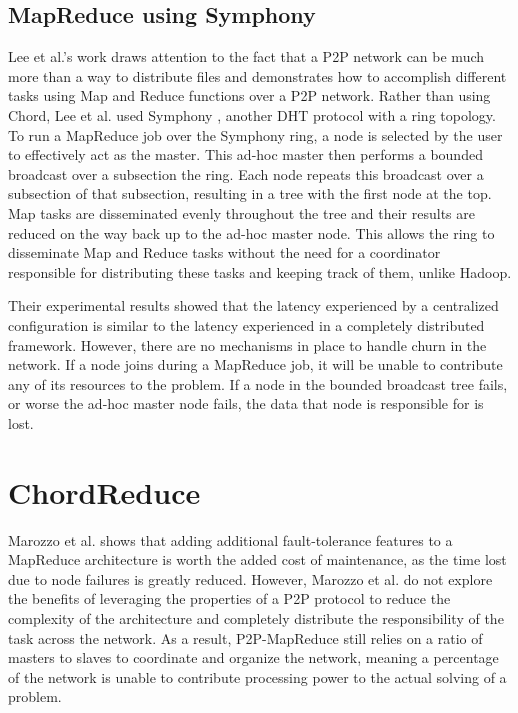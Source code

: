 \documentclass[10pt, conference, compsocconf]{IEEEtran}
\begin{document}
\subsection{MapReduce using Symphony}

Lee et al.'s work \cite{leemap} draws attention to the fact that a P2P network can be much more than a way to distribute files and demonstrates how to accomplish different tasks using Map and Reduce functions over a P2P network.  Rather than using Chord, Lee et al. used Symphony \cite{symphony}, another DHT protocol with a ring topology.  To run a MapReduce job over the Symphony ring, a node is selected by the user to effectively act as the master.  This ad-hoc master then performs a bounded broadcast over a subsection the ring.  Each node repeats this broadcast over a subsection of that subsection, resulting in a tree with the first node at the top.  Map tasks are disseminated evenly throughout the tree and their results are reduced on the way back up to the ad-hoc master node.  This allows the ring to disseminate Map and Reduce tasks without the need for a coordinator responsible for distributing these tasks and keeping track of them, unlike Hadoop.
 
Their experimental results showed that the latency experienced by a centralized configuration is similar to the latency experienced in a completely distributed framework.  However, there are no mechanisms in place to handle churn in the network.  If a node joins during a MapReduce job, it will be unable to contribute any of its resources to the problem. If a node in the bounded broadcast tree fails, or worse the ad-hoc master node fails, the data that node is responsible for is lost. 


\section{ChordReduce}
Marozzo et al. \cite{marozzo2012p2p} shows that adding additional fault-tolerance features to a MapReduce architecture is worth the added cost of maintenance, as the time lost due to node failures is greatly reduced.  However, Marozzo et al. do not explore the benefits of leveraging the properties of a P2P protocol to reduce the complexity of the architecture and completely distribute the responsibility of the task across the network.  As a result, P2P-MapReduce still relies on a ratio of masters to slaves to coordinate and organize the network, meaning a percentage of the network is unable to contribute processing power to the actual solving of a problem.   
\end{document}
